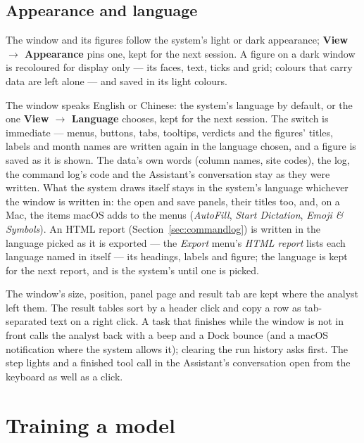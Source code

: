 \documentclass[11pt]{report}
\newcommand{\tab}[1]{\textbf{#1}}
\begin{document}
\section{Appearance and language}\label{sec:appearance}
The window and its figures follow the system's light or dark appearance;
\tab{View $\rightarrow$ Appearance} pins one, kept for the next session. A figure on a
dark window is recoloured for display only --- its faces, text, ticks and grid; colours
that carry data are left alone --- and saved in its light colours.

The window speaks English or Chinese: the system's language by default, or the one
\tab{View $\rightarrow$ Language} chooses, kept for the next session. The switch is
immediate --- menus, buttons, tabs, tooltips, verdicts and the figures' titles, labels and
month names are written again in the language chosen, and a figure is saved as it is
shown. The data's own words (column names, site codes), the log, the command log's code
and the Assistant's conversation stay as they were written. What the system draws
itself stays in the system's language whichever the window is written in: the
open and save panels, their titles too, and, on a Mac, the items macOS adds to the menus
(\emph{AutoFill}, \emph{Start Dictation}, \emph{Emoji \& Symbols}). An HTML
report (Section~\ref{sec:commandlog}) is written in the language picked as it is exported
--- the \emph{Export} menu's \emph{HTML report} lists
each language named in itself --- its headings, labels and figure; the language is kept
for the next report, and is the system's until one is picked.

The window's size, position, panel page and result tab are kept where the analyst left
them. The result tables sort by a header click and copy a row as tab-separated text on a
right click. A task that finishes while the window is not in front calls the analyst back
with a beep and a Dock bounce (and a macOS notification where the system allows it);
clearing the run history asks first. The step lights and a finished tool call in the
Assistant's conversation open from the keyboard as well as a click.

\chapter{Training a model}\label{ch:train}
\end{document}

